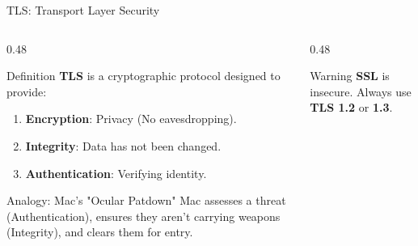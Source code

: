 \documentclass[aspectratio=169]{beamer}  %
\begin{document}
\begin{frame}{TLS: Transport Layer Security}
    \begin{columns}[T]
        \begin{column}{0.48\textwidth}
            \begin{block}{Definition}
                \small
                \textbf{TLS} is a cryptographic protocol designed to provide:
                \begin{enumerate}
                    \item \textbf{Encryption}: Privacy (No eavesdropping).
                    \item \textbf{Integrity}: Data has not been changed.
                    \item \textbf{Authentication}: Verifying identity.
                \end{enumerate}
            \end{block}
            \begin{exampleblock}{Analogy: Mac's "Ocular Patdown"}
                \small
                Mac assesses a threat (Authentication), ensures they aren't carrying weapons (Integrity), and clears them for entry.
            \end{exampleblock}
        \end{column}
        \begin{column}{0.48\textwidth}
            \begin{center}
            \end{center}
            \begin{alertblock}{Warning}
                \small
                \textbf{SSL} is insecure. Always use \textbf{TLS 1.2} or \textbf{1.3}.
            \end{alertblock}
        \end{column}
    \end{columns}
\end{frame}
\end{document}

